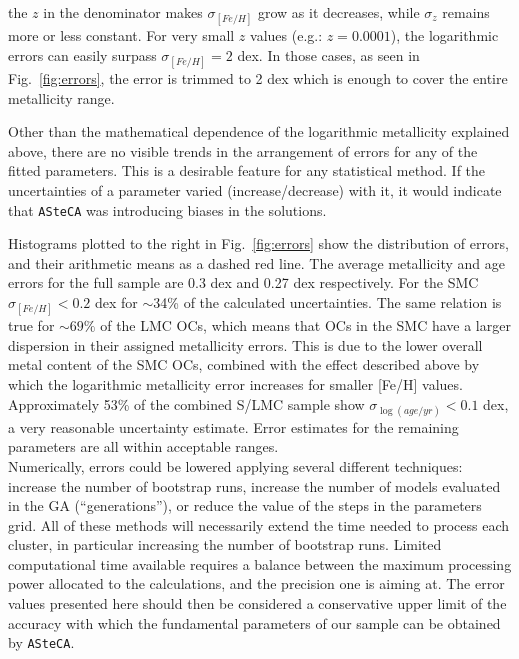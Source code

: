 \documentclass{aa}
\begin{document}
\noindent the $z$ in the denominator makes $\sigma_{[Fe/H]}$ grow as it
decreases, while $\sigma_z$ remains more or less constant.
For very small $z$ values (e.g.: $z{=}0.0001$), the
logarithmic errors can easily surpass $\sigma_{[Fe/H]}{=}2$ dex. In those cases,
as seen in Fig.~\ref{fig:errors}, the error is trimmed to 2 dex which is
enough to cover the entire metallicity range.

Other than the mathematical dependence of the logarithmic metallicity explained
above, there are no visible trends in the arrangement of errors for any of the
fitted parameters. This is a desirable feature for any statistical method.
If the uncertainties of a parameter varied (increase/decrease) with it, it would
indicate that \texttt{ASteCA} was introducing biases in the solutions.

Histograms plotted to the right in Fig.~\ref{fig:errors} show the distribution
of errors, and their arithmetic means as a dashed red line.
The average metallicity and age errors for the full sample are 0.3 dex and 0.27
dex respectively. For the SMC $\sigma_{[Fe/H]}{<}0.2$ dex for $\sim$34\% of the
calculated uncertainties. The same relation is true for ${\sim}69\%$ of the LMC
OCs, which means that OCs in the SMC have a larger dispersion in their assigned
metallicity errors. This is due to the lower overall metal content of the SMC
OCs, combined with the effect described above by which the logarithmic
metallicity error increases for smaller [Fe/H] values.
Approximately 53\% of the combined S/LMC sample show
$\sigma_{\log(age/yr)}{<}0.1$ dex, a very reasonable uncertainty estimate.
Error estimates for the remaining parameters are all within acceptable ranges.\\

Numerically, errors could be lowered applying several different techniques:
increase the number of bootstrap runs, increase the number of models evaluated
in the GA (``generations''), or reduce the value of the steps in the parameters
grid.
%
All of these methods will necessarily extend the time needed to process each
cluster, in particular increasing the number of bootstrap runs. Limited
computational time available requires a balance between the maximum processing
power allocated to the calculations, and the precision one is aiming at. The
error values presented here should then be considered a conservative upper limit
of the accuracy with which the fundamental parameters of our sample can be
obtained by \texttt{ASteCA}.\@
\end{document}

